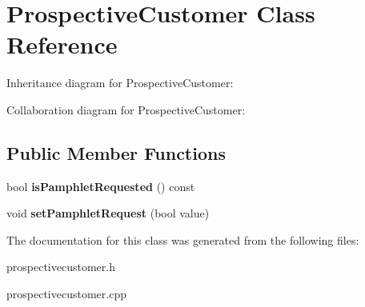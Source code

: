 \section{Prospective\+Customer Class Reference}
\label{class_prospective_customer}


Inheritance diagram for Prospective\+Customer\+:


Collaboration diagram for Prospective\+Customer\+:
\subsection*{Public Member Functions}
\begin{DoxyCompactItemize}
\item 
\mbox{\label{class_prospective_customer_a80825de354a7cdec3b020576d5ea9b48}} 
bool {\bfseries is\+Pamphlet\+Requested} () const
\item 
\mbox{\label{class_prospective_customer_a07490c867f35026db1b290dd304890ae}} 
void {\bfseries set\+Pamphlet\+Request} (bool value)
\end{DoxyCompactItemize}


The documentation for this class was generated from the following files\+:\begin{DoxyCompactItemize}
\item 
prospectivecustomer.\+h\item 
prospectivecustomer.\+cpp\end{DoxyCompactItemize}
